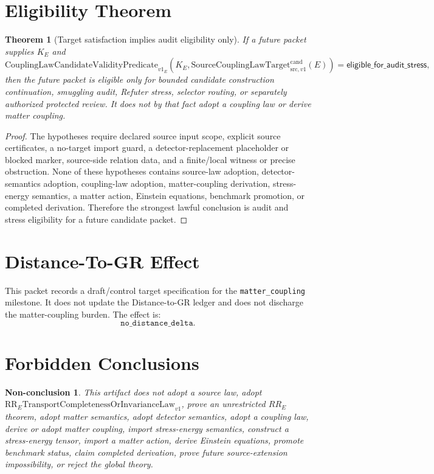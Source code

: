 \documentclass[11pt]{article}
\newcommand{\SCLTarget}{\mathrm{SourceCouplingLawTarget}^{\mathrm{cand}}_{\mathrm{src},v1}}
\newcommand{\Validity}{\mathrm{CouplingLawCandidateValidityPredicate}_{v1}}
\newtheorem{theorem}{Theorem}
\newtheorem{nonconclusion}{Non-conclusion}
\begin{document}
\section{Eligibility Theorem}

\begin{theorem}[Target satisfaction implies audit eligibility only]
If a future packet supplies \(K_E\) and
\[
  \Validity_E(K_E,\SCLTarget(E))
  =
  \mathsf{eligible\_for\_audit\_stress},
\]
then the future packet is eligible only for bounded candidate construction
continuation, smuggling audit, Refuter stress, selector routing, or separately
authorized protected review. It does not by that fact adopt a coupling law or
derive matter coupling.
\end{theorem}

\begin{proof}
The hypotheses require declared source input scope, explicit source
certificates, a no-target import guard, a detector-replacement placeholder or
blocked marker, source-side relation data, and a finite/local witness or
precise obstruction. None of these hypotheses contains source-law adoption,
detector-semantics adoption, coupling-law adoption, matter-coupling
derivation, stress-energy semantics, a matter action, Einstein equations,
benchmark promotion, or completed derivation. Therefore the strongest lawful
conclusion is audit and stress eligibility for a future candidate packet.
\end{proof}

\section{Distance-To-GR Effect}

This packet records a draft/control target specification for the
\texttt{matter\_coupling} milestone. It does not update the
Distance-to-GR ledger and does not discharge the matter-coupling burden.
The effect is:
\[
  \texttt{no\_distance\_delta}.
\]

\section{Forbidden Conclusions}

\begin{nonconclusion}
This artifact does not adopt a source law, adopt
\(\mathrm{RR}_{E}\mathrm{TransportCompletenessOrInvarianceLaw}_{v1}\), prove
an unrestricted \(RR_E\) theorem, adopt matter semantics, adopt detector
semantics, adopt a coupling law, derive or adopt matter coupling, import
stress-energy semantics, construct a stress-energy tensor, import a matter
action, derive Einstein equations, promote benchmark status, claim completed
derivation, prove future source-extension impossibility, or reject the global
theory.
\end{nonconclusion}
\end{document}
